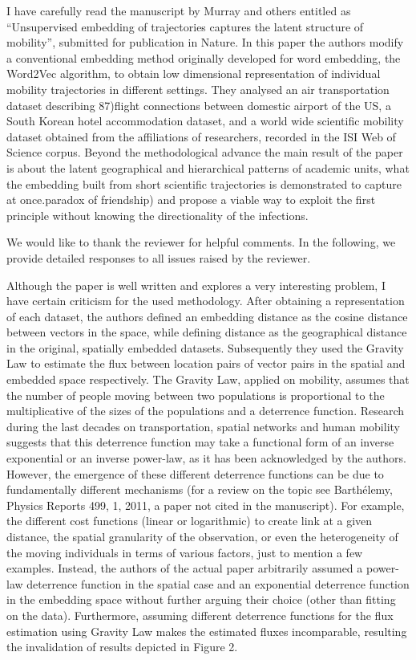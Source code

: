 \documentclass[12pt,a4paper]{article}
\newcommand{\response}[1]{{\leavevmode\noindent #1}}
\newcommand{\rcomment}[1]{%
\vspace{10pt}
\begin{tcolorbox}[colback=black!3,colframe=white!45!black]
#1
\end{tcolorbox}
}
\begin{document}
\rcomment{%
I have carefully read the manuscript by Murray and others entitled as “Unsupervised embedding of trajectories captures the latent structure of mobility”, submitted for publication in Nature. In this paper the authors modify a conventional embedding method originally developed for word embedding, the Word2Vec algorithm, to obtain low dimensional representation of individual mobility trajectories in different settings. They analysed an air transportation dataset describing 87)flight connections between domestic airport of the US, a South Korean hotel accommodation dataset, and a world wide scientific mobility dataset obtained from the affiliations of researchers, recorded in the ISI Web of Science corpus. Beyond the methodological advance the main result of the paper is about the latent geographical and hierarchical patterns of academic units, what the embedding built from short scientific trajectories is demonstrated to capture at once.paradox of friendship) and propose a viable way to exploit the first principle without knowing the directionality of the infections.
}

\response{%
We would like to thank the reviewer for helpful comments. 
In the following, we provide detailed responses to all issues raised by the reviewer.
}

\rcomment{%
Although the paper is well written and explores a very interesting problem, I have certain criticism for the used methodology. After obtaining a representation of each dataset, the authors defined an embedding distance as the cosine distance between vectors in the space, while defining distance as the geographical distance in the original, spatially embedded datasets. Subsequently they used the Gravity Law to estimate the flux between location pairs of vector pairs in the spatial and embedded space respectively. The Gravity Law, applied on mobility, assumes that the number of people moving between two populations is proportional to the multiplicative of the sizes of the populations and a deterrence function. Research during the last decades on transportation, spatial networks and human mobility suggests that this deterrence function may take a functional form of an inverse exponential or an inverse power-law, as it has been acknowledged by the authors. However, the emergence of these different deterrence functions can be due to fundamentally different mechanisms (for a review on the topic see Barthélemy, Physics Reports 499, 1, 2011, a paper not cited in the manuscript). For example, the different cost functions (linear or logarithmic) to create link at a given distance, the spatial granularity of the observation, or even the heterogeneity of the moving individuals in terms of various factors, just to mention a few examples. Instead, the authors of the actual paper arbitrarily assumed a power-law deterrence function in the spatial case and an exponential deterrence function in the embedding space without further arguing their choice (other than fitting on the data). Furthermore, assuming different deterrence functions for the flux estimation using Gravity Law makes the estimated fluxes incomparable, resulting the invalidation of results depicted in Figure 2.
}
\end{document}
